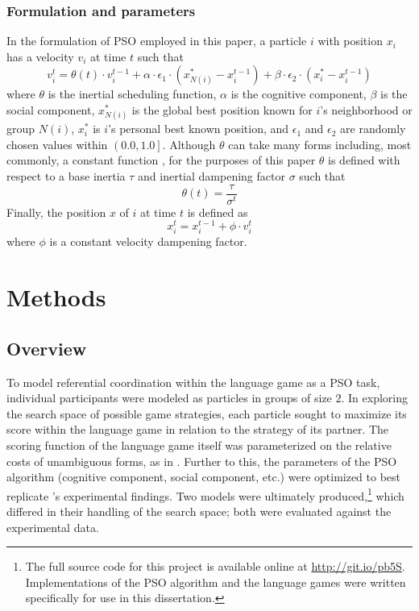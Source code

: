 \documentclass[12pt,a4paper]{article}
\begin{document}
\subsubsection{Formulation and parameters}
\label{sec:2.2.3}
In the formulation of PSO employed in this paper, a particle $i$ with position $x_i$ has a velocity $v_i$ at time $t$ such that
\begin{equation}
v_i^t = \theta(t) \cdot v_i^{t-1} + \alpha \cdot \epsilon_1 \cdot (x_{N(i)}^* - x_i^{t-1}) + \beta \cdot \epsilon_2 \cdot (x_i^* - x_i^{t-1})
\end{equation}
where $\theta$ is the inertial scheduling function, $\alpha$ is the cognitive component, $\beta$ is the social component, $x_{N(i)}^*$ is the global best position known for $i$'s neighborhood or group $N(i)$, $x_i^*$ is $i$'s personal best known position, and $\epsilon_1$ and $\epsilon_2$ are randomly chosen values within $\left(0.0, 1.0\right]$. Although $\theta$ can take many forms including, most commonly, a constant function \citep{yang2014}, for the purposes of this paper $\theta$ is defined with respect to a base inertia $\tau$ and inertial dampening factor $\sigma$ such that
\begin{equation}
\theta(t) = \frac{\tau}{\sigma^t} 
\end{equation}
Finally, the position $x$ of $i$ at time $t$ is defined as
\begin{equation}
x_i^t = x_i^{t-1} + \phi \cdot v_i^t 
\end{equation}
where $\phi$ is a constant velocity dampening factor.

\section{Methods}

\subsection{Overview}

To model referential coordination within the \citeauthor{rohde2012} language game as a PSO task, individual participants were modeled as particles in groups of size $2$. In exploring the search space of possible game strategies, each particle sought to maximize its score within the language game in relation to the strategy of its partner. The scoring function of the language game itself was parameterized on the relative costs of unambiguous forms, as in \citeauthor{rohde2012}. Further to this, the parameters of the PSO algorithm (cognitive component, social component, etc.) were optimized to best replicate \citeauthor{rohde2012}'s experimental findings. Two models were ultimately produced,\footnote{The full source code for this project is available online at \url{http://git.io/pb5S}. Implementations of the PSO algorithm and the  \citeauthor{rohde2012} language games were written specifically for use in this dissertation.} which differed in their handling of the search space; both were evaluated against the experimental data.
\end{document}
